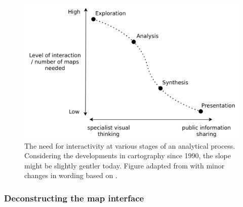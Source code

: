 \begin{figure}[H]
	\centering
	\includegraphics[width=\diagramwidth]{visual/figures/diagrams/swoopy.png}
	\caption{
		The need for interactivity at various stages of an analytical process.
		Considering the developments in cartography since 1990,
		the slope might be slightly gentler today.
		Figure adapted from \textcite{dib1990} with minor changes in wording based on
		\textcite{rot2015, mac1997}.
	}
	\label{fig:analytical process interaction}
\end{figure}


\subsubsection{Deconstructing the map interface}
\label{deconstructing the map interface}

